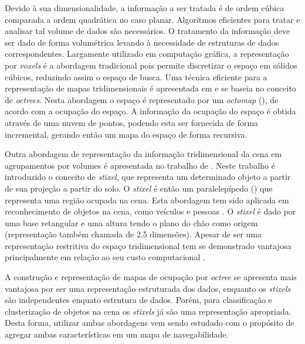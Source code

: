 Devido à sua dimensionalidade, a informação a ser tratada é de ordem cúbica
comparada a ordem quadrática no caso planar. Algoritmos eficientes para tratar e
analisar tal volume de dados são necessários. O tratamento da informação deve
ser dado de forma volumétrica levando à necessidade de estruturas de dados
correspondentes. Largamente utilizado em computação gráfica, a representação por
\textit{voxels} é a abordagem tradicional pois permite discretizar o espaço em
sólidos cúbicos, reduzindo assim o espaço de busca. Uma técnica eficiente para a
representação de mapas tridimensionais é apresentada em \cite{octomap} e se
baseia no conceito de \textit{octrees}. Nesta abordagem o espaço é representado
por um \textit{octomap} (), de acordo com a ocupação do espaço.
A informação da ocupação do espaço é obtida através de uma nuvem de pontos,
podendo esta ser fornecida de forma incremental, gerando então um mapa do espaço
de forma recursiva.

Outra abordagem de representação da informação tridimensional da cena em
agrupamentos por volumes é apresentada no trabalho de \cite{stixelworld}. Neste
trabalho é introduzido o conceito de \textit{stixel}, que representa um
determinado objeto a partir de sua projeção a partir do solo. O \textit{stixel}
é então um paralelepípedo () que representa uma região ocupada
na cena. Esta abordagem tem sido aplicada em reconhecimento de objetos na cena,
como veículos e pessoas \cite{Benenson2012}. O \textit{stixel} é dado por uma
base retangular e uma altura tendo o plano do chão como origem (representação
também chamada de 2,5 dimensões). Apesar de ser uma representação restritiva do
espaço tridimensional tem se demonstrado vantajosa principalmente em relação ao
seu custo computacional \cite{Benenson2011}.


A construção e representação de mapas de ocupação por \textit{octree} se
apresenta mais vantajosa por ser uma representação estruturada dos dados,
enquanto os \textit{stixels} são independentes enquato estrutura de dados.
Porém, para classificação e clusterização de objetos na cena os \textit{stixels} já são
uma representação apropriada. Desta forma, utilizar ambas abordagens vem sendo
estudado com o propósito de agregar ambas características em um mapa de
navegabilidade.


